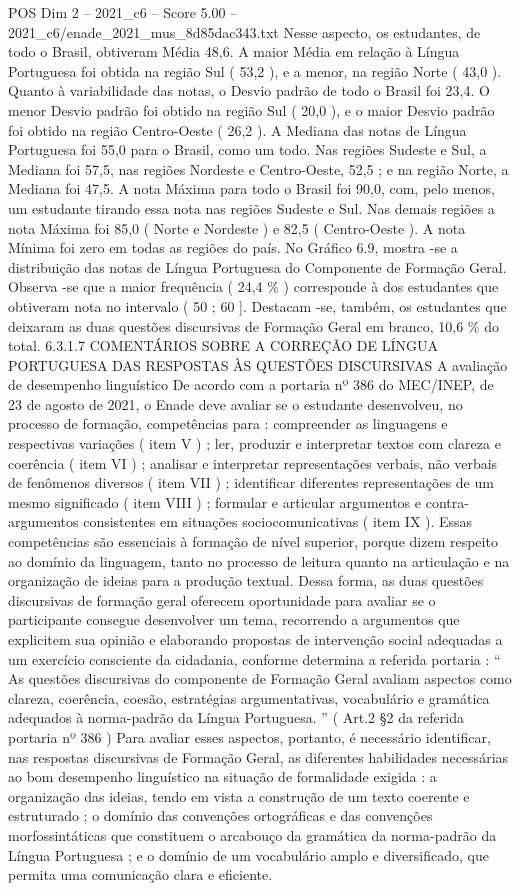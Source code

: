 \begin{textsample}{POS Dim 2 – 2021\_c6 – Score 5.00 – 2021\_c6/enade\_2021\_mus\_8d85dac343.txt}
Nesse aspecto, os estudantes, de todo o Brasil, obtiveram Média 48,6.
A maior Média em relação à Língua Portuguesa foi obtida na região Sul ( 53,2 ), e a menor, na região Norte ( 43,0 ).
Quanto à variabilidade das notas, o Desvio padrão de todo o Brasil foi 23,4.
O menor Desvio padrão foi obtido na região Sul ( 20,0 ), e o maior Desvio padrão foi obtido na região Centro-Oeste ( 26,2 ).
A Mediana das notas de Língua Portuguesa foi 55,0 para o Brasil, como um todo.
Nas regiões Sudeste e Sul, a Mediana foi 57,5, nas regiões Nordeste e Centro-Oeste, 52,5 ; e na região Norte, a Mediana foi 47,5.
A nota Máxima para todo o Brasil foi 90,0, com, pelo menos, um estudante tirando essa nota nas regiões Sudeste e Sul.
Nas demais regiões a nota Máxima foi 85,0 ( Norte e Nordeste ) e 82,5 ( Centro-Oeste ).
A nota Mínima foi zero em todas as regiões do país.
No Gráfico 6.9, mostra -se a distribuição das notas de Língua Portuguesa do Componente de Formação Geral.
Observa -se que a maior frequência ( 24,4 \% ) corresponde à dos estudantes que obtiveram nota no intervalo ( 50 ; 60 ].
Destacam -se, também, os estudantes que deixaram as duas questões discursivas de Formação Geral em branco, 10,6 \% do total. 6.3.1.7 COMENTÁRIOS SOBRE A CORREÇÃO DE LÍNGUA PORTUGUESA DAS RESPOSTAS ÀS QUESTÕES DISCURSIVAS A avaliação de desempenho linguístico De acordo com a portaria nº 386 do MEC/INEP, de 23 de agosto de 2021, o Enade deve avaliar se o estudante desenvolveu, no processo de formação, competências para : compreender as linguagens e respectivas variações ( item V ) ; ler, produzir e interpretar textos com clareza e coerência ( item VI ) ; analisar e interpretar representações verbais, não verbais de fenômenos diversos ( item VII ) ; identificar diferentes representações de um mesmo significado ( item VIII ) ; formular e articular argumentos e contra-argumentos consistentes em situações sociocomunicativas ( item IX ).
Essas competências são essenciais à formação de nível superior, porque dizem respeito ao domínio da linguagem, tanto no processo de leitura quanto na articulação e na organização de ideias para a produção textual.
Dessa forma, as duas questões discursivas de formação geral oferecem oportunidade para avaliar se o participante consegue desenvolver um tema, recorrendo a argumentos que explicitem sua opinião e elaborando propostas de intervenção social adequadas a um exercício consciente da cidadania, conforme determina a referida portaria : “ As questões discursivas do componente de Formação Geral avaliam aspectos como clareza, coerência, coesão, estratégias argumentativas, vocabulário e gramática adequados à norma-padrão da Língua Portuguesa. ” ( Art.2 §2 da referida portaria nº 386 ) Para avaliar esses aspectos, portanto, é necessário identificar, nas respostas discursivas de Formação Geral, as diferentes habilidades necessárias ao bom desempenho linguístico na situação de formalidade exigida : a organização das ideias, tendo em vista a construção de um texto coerente e estruturado ; o domínio das convenções ortográficas e das convenções morfossintáticas que constituem o arcabouço da gramática da norma-padrão da Língua Portuguesa ; e o domínio de um vocabulário amplo e diversificado, que permita uma comunicação clara e eficiente.

\end{textsample}
